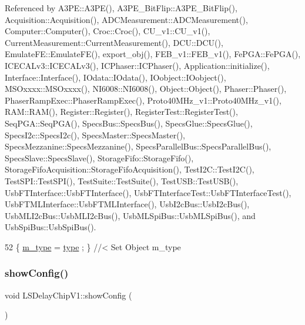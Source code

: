 Referenced by A3\+P\+E\+::\+A3\+P\+E(), A3\+P\+E\+\_\+\+Bit\+Flip\+::\+A3\+P\+E\+\_\+\+Bit\+Flip(), Acquisition\+::\+Acquisition(), A\+D\+C\+Measurement\+::\+A\+D\+C\+Measurement(), Computer\+::\+Computer(), Croc\+::\+Croc(), C\+U\+\_\+v1\+::\+C\+U\+\_\+v1(), Current\+Measurement\+::\+Current\+Measurement(), D\+C\+U\+::\+D\+C\+U(), Emulate\+F\+E\+::\+Emulate\+F\+E(), export\+\_\+obj(), F\+E\+B\+\_\+v1\+::\+F\+E\+B\+\_\+v1(), Fe\+P\+G\+A\+::\+Fe\+P\+G\+A(), I\+C\+E\+C\+A\+Lv3\+::\+I\+C\+E\+C\+A\+Lv3(), I\+C\+Phaser\+::\+I\+C\+Phaser(), Application\+::initialize(), Interface\+::\+Interface(), I\+Odata\+::\+I\+Odata(), I\+Oobject\+::\+I\+Oobject(), M\+S\+Oxxxx\+::\+M\+S\+Oxxxx(), N\+I6008\+::\+N\+I6008(), Object\+::\+Object(), Phaser\+::\+Phaser(), Phaser\+Ramp\+Exec\+::\+Phaser\+Ramp\+Exec(), Proto40\+M\+Hz\+\_\+v1\+::\+Proto40\+M\+Hz\+\_\+v1(), R\+A\+M\+::\+R\+A\+M(), Register\+::\+Register(), Register\+Test\+::\+Register\+Test(), Seq\+P\+G\+A\+::\+Seq\+P\+G\+A(), Specs\+Bus\+::\+Specs\+Bus(), Specs\+Glue\+::\+Specs\+Glue(), Specs\+I2c\+::\+Specs\+I2c(), Specs\+Master\+::\+Specs\+Master(), Specs\+Mezzanine\+::\+Specs\+Mezzanine(), Specs\+Parallel\+Bus\+::\+Specs\+Parallel\+Bus(), Specs\+Slave\+::\+Specs\+Slave(), Storage\+Fifo\+::\+Storage\+Fifo(), Storage\+Fifo\+Acquisition\+::\+Storage\+Fifo\+Acquisition(), Test\+I2\+C\+::\+Test\+I2\+C(), Test\+S\+P\+I\+::\+Test\+S\+P\+I(), Test\+Suite\+::\+Test\+Suite(), Test\+U\+S\+B\+::\+Test\+U\+S\+B(), Usb\+F\+T\+Interface\+::\+Usb\+F\+T\+Interface(), Usb\+F\+T\+Interface\+Test\+::\+Usb\+F\+T\+Interface\+Test(), Usb\+F\+T\+M\+L\+Interface\+::\+Usb\+F\+T\+M\+L\+Interface(), Usb\+I2c\+Bus\+::\+Usb\+I2c\+Bus(), Usb\+M\+L\+I2c\+Bus\+::\+Usb\+M\+L\+I2c\+Bus(), Usb\+M\+L\+Spi\+Bus\+::\+Usb\+M\+L\+Spi\+Bus(), and Usb\+Spi\+Bus\+::\+Usb\+Spi\+Bus().


\begin{DoxyCode}
52 \{ \hyperlink{classObject_a457a600fe8c00eb1034374f75110a78c}{m\_type}  = \hyperlink{classObject_a84f99f70f144a83e1582d1d0f84e4e62}{type}  ; \} \textcolor{comment}{//< Set Object m\_type}
\end{DoxyCode}
\mbox{\label{classLSDelayChipV1_a01c1e85ae0d0e031164fe2d47b4f4824}} 
\subsubsection{\texorpdfstring{show\+Config()}{showConfig()}}
{\footnotesize\ttfamily void L\+S\+Delay\+Chip\+V1\+::show\+Config (\begin{DoxyParamCaption}{ }\end{DoxyParamCaption})}



